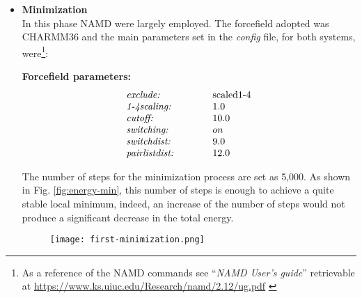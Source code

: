 \begin{itemize}
\item \textbf{Minimization}\\
In this phase NAMD were largely employed. The forcefield adopted was CHARMM36 and the main parameters set in the \textit{config} file, for both systems, were\footnote{As a reference of the NAMD commands see ``\textit{NAMD User's guide}'' retrievable at \url{https://www.ks.uiuc.edu/Research/namd/2.12/ug.pdf} \cite{ref:NAMD_ug}}:\\
\begin{center}
\textbf{Forcefield parameters:}
\vspace{-0.25cm}
\begin{equation*}
\begin{array}{ll}
\text{\textit{exclude:}} \qquad\quad & \text{scaled1-4}\\
\text{\textit{1-4scaling:}} \qquad\quad & 1.0\\
\text{\textit{cutoff:}} \qquad\quad & 10.0\\
\text{\textit{switching:}} \qquad\quad & on\\
\text{\textit{switchdist:}} \qquad\quad & 9.0\\
\text{\textit{pairlistdist:}} \qquad\quad & 12.0\\
\end{array}
\end{equation*}
\end{center}
The number of steps for the minimization process are set as 5,000. As shown in Fig. \ref{fig:energy-min}, this number of steps is enough to achieve a quite stable local minimum, indeed, an increase of the number of steps would not produce a significant decrease in the total energy.

\begin{figure}[H]
\centering
\begin{minipage}[t]{0.775\textwidth}
	\centering
    \texttt{[image: first-minimization.png]}
    

\end{minipage}
\end{figure}
\end{itemize}
